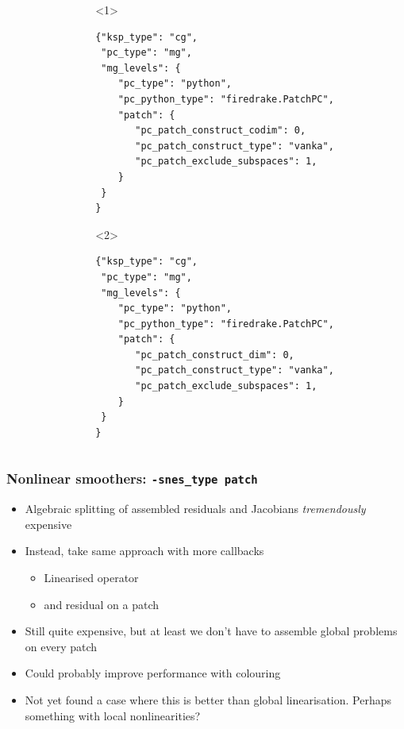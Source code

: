 \documentclass[presentation,aspectratio=43,10pt]{beamer}
\newcommand{\convexpath}[2]{
  [
  create hullcoords/.code={
    \global\edef\namelist{#1}
    \foreach [count=\counter] \nodename in \namelist {
      \global\edef\numberofnodes{\counter}
      \coordinate (hullcoord\counter) at (\nodename);
    }
    \coordinate (hullcoord0) at (hullcoord\numberofnodes);
    \pgfmathtruncatemacro\lastnumber{\numberofnodes+1}
    \coordinate (hullcoord\lastnumber) at (hullcoord1);
  },
  create hullcoords
  ]
  ($(hullcoord1)!#2!-90:(hullcoord0)$)
  \foreach [
  evaluate=\currentnode as \previousnode using \currentnode-1,
  evaluate=\currentnode as \nextnode using \currentnode+1
  ] \currentnode in {1,...,\numberofnodes} {
    let \p1 = ($(hullcoord\currentnode) - (hullcoord\previousnode)$),
    \n1 = {atan2(\y1,\x1) + 90},
    \p2 = ($(hullcoord\nextnode) - (hullcoord\currentnode)$),
    \n2 = {atan2(\y2,\x2) + 90},
    \n{delta} = {Mod(\n2-\n1,360) - 360}
    in
    {arc [start angle=\n1, delta angle=\n{delta}, radius=#2]}
    -- ($(hullcoord\nextnode)!#2!-90:(hullcoord\currentnode)$)
  }
}
\begin{document}
\begin{frame}[fragile]
\begin{columns}
\begin{column}{0.4\textwidth}
\begin{onlyenv}
\begin{center}
        \end{center}
      \end{onlyenv}
    \end{column}
    \begin{column}{0.6\textwidth}
      \begin{onlyenv}<1>
\begin{verbatim}
{"ksp_type": "cg",
 "pc_type": "mg",
 "mg_levels": {
    "pc_type": "python",
    "pc_python_type": "firedrake.PatchPC",
    "patch": {
       "pc_patch_construct_codim": 0,
       "pc_patch_construct_type": "vanka",
       "pc_patch_exclude_subspaces": 1,
    }
 }
}
\end{verbatim}
      \end{onlyenv}
      \begin{onlyenv}<2>
\begin{verbatim}
{"ksp_type": "cg",
 "pc_type": "mg",
 "mg_levels": {
    "pc_type": "python",
    "pc_python_type": "firedrake.PatchPC",
    "patch": {
       "pc_patch_construct_dim": 0,
       "pc_patch_construct_type": "vanka",
       "pc_patch_exclude_subspaces": 1,
    }
 }
}
\end{verbatim}
      \end{onlyenv}
    \end{column}
  \end{columns}
\end{frame}

\begin{frame}
  \frametitle{Nonlinear smoothers: \texttt{-snes\_type patch}}
  \begin{itemize}
  \item Algebraic splitting of assembled residuals and Jacobians
    \emph{tremendously} expensive
  \item Instead, take same approach with more callbacks
    \begin{itemize}
    \item Linearised operator
    \item and residual on a patch
    \end{itemize}
  \item Still quite expensive, but at least we don't have to assemble
    global problems on every patch
  \item Could probably improve performance with colouring
  \item Not yet found a case where this is better than global
    linearisation. Perhaps something with local nonlinearities?
  \end{itemize}
\end{frame}
\end{document}

